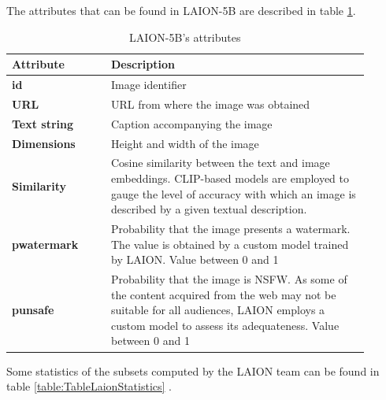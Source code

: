 The attributes that can be found in LAION-5B are described in table \ref{table:TableLaionAttributes}.

\begin{table}[ht]
\centering
\begin{tabular}{|p{0.25\linewidth} | p{0.65\linewidth}|}
\hline
\rowcolor[HTML]{9B9B9B} 
{\textbf{Attribute}} & {\textbf{Description}} \\ \hline
\textbf{id} & Image identifier \\ \hline
\textbf{URL} & URL from where the image was obtained \\ \hline
\textbf{Text string} & Caption accompanying the image \\ \hline
\textbf{Dimensions} & Height and width of the image \\ \hline
\textbf{Similarity} & Cosine similarity between the text and image embeddings. CLIP-based   models are employed to gauge the level of accuracy with which an image is   described by a given textual description.\\ \hline
\textbf{pwatermark} & Probability that the image presents a watermark. The value is   obtained by a custom model trained by LAION. Value between 0 and 1 \\ \hline
\textbf{punsafe} & Probability that the image is NSFW. As some of the content   acquired from the web may not be suitable for all audiences, LAION employs a   custom model to assess its adequateness. Value between 0 and 1 \\ \hline
\end{tabular}
\caption{LAION-5B’s attributes}
\label{table:TableLaionAttributes}
\end{table}

Some statistics of the subsets computed by the LAION team can be found in table \ref{table:TableLaionStatistics} \cite{schuhmann2022laion}.

